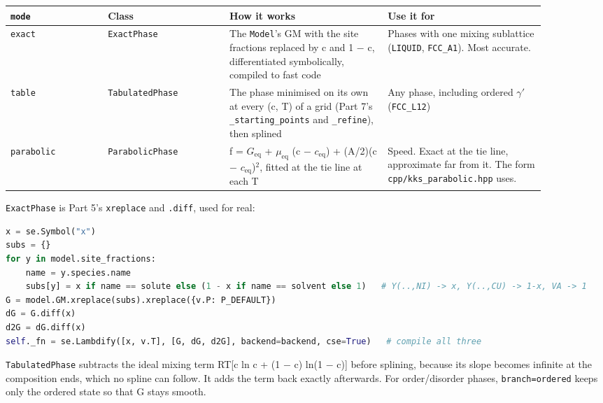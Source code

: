 \documentclass[12pt,a4paper]{article}
\begin{document}
\begingroup\small
\begin{longtable}{>{\raggedright\arraybackslash}p{0.161\linewidth}>{\raggedright\arraybackslash}p{0.202\linewidth}>{\raggedright\arraybackslash}p{0.266\linewidth}>{\raggedright\arraybackslash}p{0.265\linewidth}}
\toprule
\textbf{\texttt{mode}} & \textbf{Class} & \textbf{How it works} & \textbf{Use it for} \\
\midrule
\endhead
\texttt{\textquotedbl{}exact\textquotedbl{}} & \texttt{ExactPhase} & The \texttt{Model}'s GM with the site fractions replaced by c and 1 \(-\) c, differentiated symbolically, compiled to fast code & Phases with one mixing sublattice (\texttt{LIQUID}, \texttt{FCC\_\allowbreak{}A1}). Most accurate. \\
\texttt{\textquotedbl{}table\textquotedbl{}} & \texttt{TabulatedPhase} & The phase minimised on its own at every (c, T) of a grid (Part 7's \texttt{\_\allowbreak{}starting\_\allowbreak{}points} and \texttt{\_\allowbreak{}refine}), then splined & Any phase, including ordered \(\gamma '\) (\texttt{FCC\_\allowbreak{}L12}) \\
\texttt{\textquotedbl{}parabolic\textquotedbl{}} & \texttt{ParabolicPhase} & f = \(G_{\mathrm{eq}}\) + \(\mu_{\mathrm{eq}}\) (c \(-\) \(c_{\mathrm{eq}}\)) + (A/2)(c \(-\) \(c_{\mathrm{eq}}\))\(^{2}\), fitted at the tie line at each T & Speed. Exact at the tie line, approximate far from it. The form \texttt{cpp/\allowbreak{}kks\_\allowbreak{}parabolic.\allowbreak{}hpp} uses. \\
\bottomrule
\end{longtable}
\endgroup
\texttt{ExactPhase} is Part 5's \texttt{xreplace} and \texttt{.\allowbreak{}diff}, used for real:

\begin{lstlisting}[basicstyle={\scriptsize\ttfamily},language=Python]
x = se.Symbol("x")
subs = {}
for y in model.site_fractions:
    name = y.species.name
    subs[y] = x if name == solute else (1 - x if name == solvent else 1)   # Y(..,NI) -> x, Y(..,CU) -> 1-x, VA -> 1
G = model.GM.xreplace(subs).xreplace({v.P: P_DEFAULT})
dG = G.diff(x)
d2G = dG.diff(x)
self._fn = se.Lambdify([x, v.T], [G, dG, d2G], backend=backend, cse=True)   # compile all three
\end{lstlisting}
\texttt{TabulatedPhase} subtracts the ideal mixing term RT[c ln c + (1 \(-\) c) ln(1 \(-\) c)] before splining, because its slope becomes infinite at the composition ends, which no spline can follow. It adds the term back exactly afterwards. For order/disorder phases, \texttt{branch=\textquotedbl{}ordered\textquotedbl{}} keeps only the ordered state so that G stays smooth.
\end{document}
